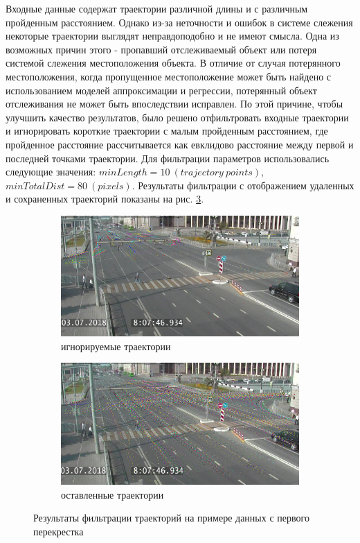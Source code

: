 Входные данные содержат траектории различной длины и с различным пройденным расстоянием. Однако из-за неточности и ошибок в системе слежения некоторые траектории выглядят неправдоподобно и не имеют смысла. Одна из возможных причин этого - пропавший отслеживаемый объект или потеря системой слежения местоположения объекта. В отличие от случая потерянного местоположения, когда пропущенное местоположение может быть найдено с использованием моделей аппроксимации и регрессии, потерянный объект отслеживания не может быть впоследствии исправлен. По этой причине, чтобы улучшить качество результатов, было решено отфильтровать входные траектории и игнорировать короткие траектории с малым пройденным расстоянием, где пройденное расстояние рассчитывается как евклидово расстояние между первой и последней точками траектории. Для фильтрации параметров использовались следующие значения: $minLength = 10\ (trajectory \ points)$, $minTotalDist = 80 \ (pixels)$. Результаты фильтрации с отображением удаленных и сохраненных траекторий показаны на рис. \ref{fig:traj_filter}.

\begin{figure}
	\centering
	\begin{subfigure}[b]{0.48\textwidth}
		\centering{}
		\includegraphics[width=\textwidth]{images/traj-filter-out.png}
		\caption{игнорируемые траектории}
		\label{fig:traj_filter_out}
	\end{subfigure}
	\hfill
	\begin{subfigure}[b]{0.48\textwidth}
		\centering{}
		\includegraphics[width=\textwidth]{images/traj-filter-keep.png}
		\caption{оставленные траектории}
		\label{fig:traj_filter_keep}
	\end{subfigure}
	\caption{Результаты фильтрации траекторий на примере данных с первого перекрестка}
	\label{fig:traj_filter}
\end{figure}

